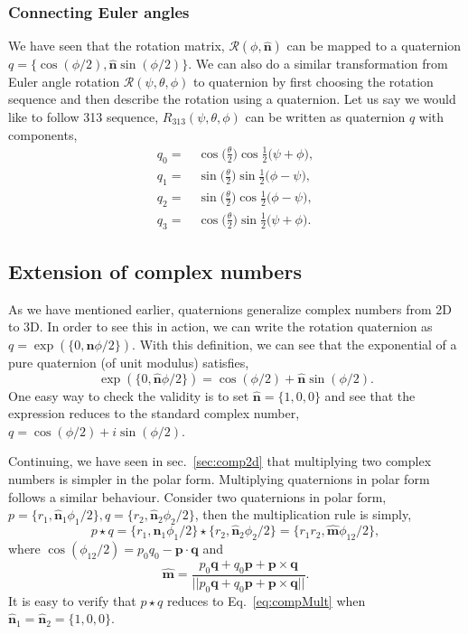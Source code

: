\documentclass{article}
\def\nh{\hat{\mathbf{n}}}
\def\mh{\hat{\mathbf{m}}}
\def\q{\mathbf{q}}
\def\p{\mathbf{p}}
\def\R{\mathcal{R}}
\def\nh{\hat{\mathbf{n}}}
\begin{document}
\subsubsection*{Connecting Euler angles}
We have seen that the rotation matrix, $\R (\phi, \nh)$ can be mapped to a quaternion $q = \{ \cos (\phi/2), \nh \sin (\phi/2) \}$. We can also do a similar transformation from Euler angle rotation $\R (\psi, \theta, \phi)$ to quaternion by first choosing the rotation sequence and then describe the rotation using a quaternion. Let us say we would like to follow 313 sequence, $R_{313}(\psi, \theta, \phi)$ can be written as quaternion $q$ with components,
\begin{align*}
  q_0 =& \ \cos \Big( \frac{\theta}{2} \Big) \cos \frac{1}{2} \Big( \psi + \phi \Big), \\
  q_1 =& \ \sin \Big( \frac{\theta}{2} \Big) \sin \frac{1}{2} \Big( \phi - \psi \Big), \\
  q_2 =& \ \sin \Big( \frac{\theta}{2} \Big) \cos \frac{1}{2} \Big( \phi - \psi \Big), \\
  q_3 =& \ \cos \Big( \frac{\theta}{2} \Big) \sin \frac{1}{2} \Big( \psi + \phi \Big).
\end{align*}

\subsection{Extension of complex numbers}
As we have mentioned earlier, quaternions generalize complex numbers from 2D to 3D. In order to see this in action, we can write the rotation quaternion as $q = \exp (\{0, \nh \phi/2 \})$. With this definition, we can see that the exponential of a pure quaternion (of unit modulus) satisfies,
\[
  \exp ( \{ 0, \nh \phi/2 \}) = \cos(\phi/2) + \nh \sin(\phi/2).
\]
One easy way to check the validity is to set $\nh = \{ 1, 0, 0 \}$ and see that the expression reduces to the standard complex number, $q = \cos (\phi/2) + i \sin (\phi/2)$.

\noindent Continuing, we have seen in sec.~\ref{sec:comp2d} that multiplying two complex numbers is simpler in the polar form. Multiplying quaternions in polar form follows a similar behaviour. Consider two quaternions in polar form, $p = \{ r_1, \nh_1 \phi_1/2 \}, q = \{ r_2, \nh_2 \phi_2/2 \}$, then the multiplication rule is simply,
\[
  p \star q = \{ r_1, \nh_1 \phi_1/2 \} \star \{ r_2, \nh_2 \phi_2/2 \} = \{ r_1 r_2, \mh \phi_{12}/2 \},
\]
where $\cos (\phi_{12}/2) = p_0q_0 - \p \cdot \q$ and
\[
  \mh = \frac{p_0 \q + q_0 \p + \p \times \q}{||p_0 \q + q_0 \p + \p \times \q||}.
\]
It is easy to verify that $p \star q$ reduces to Eq.~\ref{eq:compMult} when $\nh_1 = \nh_2 = \{ 1, 0, 0 \}$.
\end{document}
